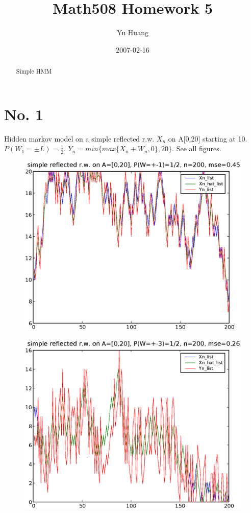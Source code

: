 \documentclass[a4paper,10pt]{article}
\title{Math508 Homework 5}
\author{Yu Huang}
\date{2007-02-16}
\begin{document}
\maketitle

\begin{abstract}
Simple HMM
\end{abstract}

\section{No. 1}
Hidden markov model on a simple reflected r.w. $X_n$ on A[0,20] starting at 10. $P(W_1 = \pm L) = \frac{1}{2}$. $Y_n = min\{max\{X_n+W_n, 0\}, 20\}$. See all figures.

\begin{figure}[h]
\includegraphics[width=1\textwidth]{hw5_1_K_20_L_1_n_200.eps}
\caption{}
\end{figure}

\begin{figure}[p]
\includegraphics[width=1\textwidth]{hw5_1_K_20_L_3_n_200.eps}
\caption{}
\end{figure}
\end{document}

